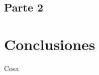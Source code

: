 \documentclass[10pt, a4paper]{article}
\begin{document}
\newpage

\subsection{Parte 2}



\section{Conclusiones}

    Cosa
\end{document}
